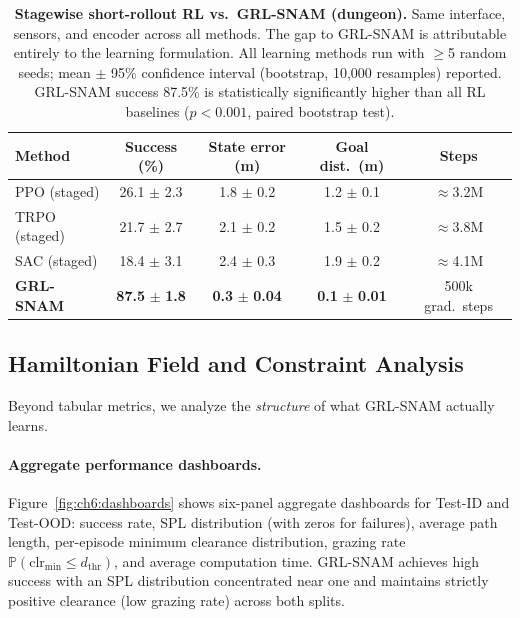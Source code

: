 \begin{table}[htbp]
\centering
\caption{\textbf{Stagewise short-rollout RL vs.\ GRL-SNAM (dungeon).}
  Same interface, sensors, and encoder across all methods.
  The gap to GRL-SNAM is attributable entirely to the learning
  formulation.
  All learning methods run with $\geq$5 random seeds; mean $\pm$ 95\%
  confidence interval (bootstrap, 10{,}000 resamples) reported.
  GRL-SNAM success 87.5\% is statistically significantly higher than all
  RL baselines ($p < 0.001$, paired bootstrap test).}
\label{tab:ch6:staged_rl}
\small
\begin{tabular}{lcccc}
\toprule
\textbf{Method} & \textbf{Success (\%)} &
\textbf{State error (m)} & \textbf{Goal dist.\ (m)} & \textbf{Steps} \\
\midrule
PPO (staged)  & 26.1 $\pm$ 2.3 & 1.8 $\pm$ 0.2 & 1.2 $\pm$ 0.1 & $\approx$3.2M \\
TRPO (staged) & 21.7 $\pm$ 2.7 & 2.1 $\pm$ 0.2 & 1.5 $\pm$ 0.2 & $\approx$3.8M \\
SAC (staged)  & 18.4 $\pm$ 3.1 & 2.4 $\pm$ 0.3 & 1.9 $\pm$ 0.2 & $\approx$4.1M \\
\midrule
\textbf{GRL-SNAM} & \textbf{87.5} $\pm$ \textbf{1.8} &
  \textbf{0.3} $\pm$ \textbf{0.04} & \textbf{0.1} $\pm$ \textbf{0.01} &
  500k grad.\ steps \\
\bottomrule
\end{tabular}
\end{table}

\subsection{Hamiltonian Field and Constraint Analysis}
\label{subsec:ch6:hamiltonian_analysis}

Beyond tabular metrics, we analyze the \emph{structure} of what GRL-SNAM
actually learns.

\paragraph{Aggregate performance dashboards.}
Figure~\ref{fig:ch6:dashboards} shows six-panel aggregate dashboards for
Test-ID and Test-OOD: success rate, SPL distribution (with zeros for
failures), average path length, per-episode minimum clearance distribution,
grazing rate $\mathbb{P}(\mathrm{clr}_{\min}\leq d_{\mathrm{thr}})$,
and average computation time.
GRL-SNAM achieves high success with an SPL distribution concentrated near
one and maintains strictly positive clearance (low grazing rate)
across both splits.

